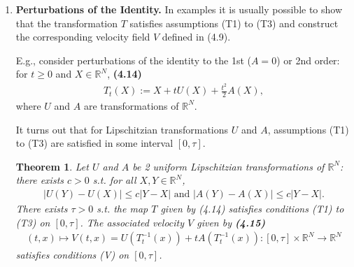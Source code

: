 \documentclass{book}
\numberwithin{equation}{section}
\newtheorem{theorem}{Theorem}[section]
\begin{document}
\begin{enumerate}
    This equivalence theorem says that we can start either from a family of velocity fields  $\{V(t)\}$ on $\mathbb{R}^N$ or a family of transformations $\{T_t\}$ of $\mathbb{R}^N$ provided that the map $V$, $V(t,x) = V(t)(x)$, satisfies (V) or the map $T$, $T(t,X) = T_t(X)$, satisfies (T1) to (T3).
    
    Starting from $V$, the family of homeomorphisms $\{T_t(V)\}$ generates the family \textbf{(4.13)}
    \begin{align*}
        \Omega_t := T_t(V)(\Omega) = \left\{T_t(V)(X);X\in\Omega\right\}
    \end{align*}
    of perturbations of the initial domain $\Omega$.
    
    Interior (resp., boundary) points of $\Omega$ are mapped onto interior (resp., boundary) points of $\Omega_t$.
    
    This is the basis of the \textit{velocity method} which will be used to define shape derivatives.
    \item \textbf{Perturbations of the Identity.} In examples it is usually possible to show that the transformation $T$ satisfies assumptions (T1) to (T3) and construct the corresponding velocity field $V$ defined in (4.9).
    
    E.g., consider perturbations of the identity to the 1st ($A = 0$) or 2nd order: for $t\ge 0$ and $X\in\mathbb{R}^N$, \textbf{(4.14)}
    \begin{align*}
        T_t(X) := X + tU(X) + \frac{t^2}{2}A(X),
    \end{align*}
    where $U$ and $A$ are transformations of $\mathbb{R}^N$.
    
    It turns out that for Lipschitzian transformations $U$ and $A$, assumptions (T1) to (T3) are satisfied in some interval $[0,\tau]$.
    
    \begin{theorem}
        Let $U$ and $A$ be 2 uniform Lipschitzian transformations of $\mathbb{R}^N$: there exists $c > 0$ s.t. for all $X,Y\in\mathbb{R}^N$,
        \begin{align*}
            \left|U(Y) - U(X)\right|\le c\left|Y - X\right| \mbox{ and } \left|A(Y) - A(X)\right|\le c\left|Y - X\right|.
        \end{align*}
        There exists $\tau > 0$ s.t. the map $T$ given by (4.14) satisfies conditions (T1) to (T3) on $[0,\tau]$. The associated velocity $V$ given by \textbf{(4.15)}
        \begin{align*}
            (t,x)\mapsto V(t,x) = U\left(T_t^{-1}(x)\right) + tA\left(T_t^{-1}(x)\right):[0,\tau]\times\mathbb{R}^N\to\mathbb{R}^N
        \end{align*}
        satisfies conditions (V) on $[0,\tau]$.
    \end{theorem}


\end{enumerate}
\end{document}
